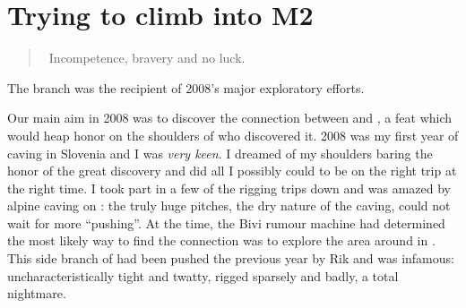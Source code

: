 \section{Trying to climb into M2}

\begin{quote} Incompetence, bravery and no luck. \end{quote}



\begin{marginsurvey}
\checkoddpage \ifoddpage \forcerectofloat \else \forceversofloat \fi
\centering
 \caption[2007 Captain Kangaroo Survey]{The \protect{} branch was the recipient of 2008's major exploratory efforts.}
 \label{cptk pre2008 survey}
\end{marginsurvey}


Our main aim in 2008 was to discover the connection between 
and , a feat which would heap honor on the
shoulders of who discovered it. 2008 was my first year of caving in
Slovenia and I was \textit{very keen}. I dreamed of my shoulders baring
the honor of the great discovery and did all I possibly could to be on
the right trip at the right time. I took part in a few of the rigging
trips down  and was amazed by alpine caving on : the
truly huge pitches, the dry nature of the caving, could not wait for
more ``pushing''. At the time, the Bivi rumour machine had determined
the most likely way to find the connection was to explore the area
around  in . This side branch
of  had been pushed the previous year by Rik and was
infamous: uncharacteristically tight and twatty, rigged sparsely and
badly, a total nightmare.


